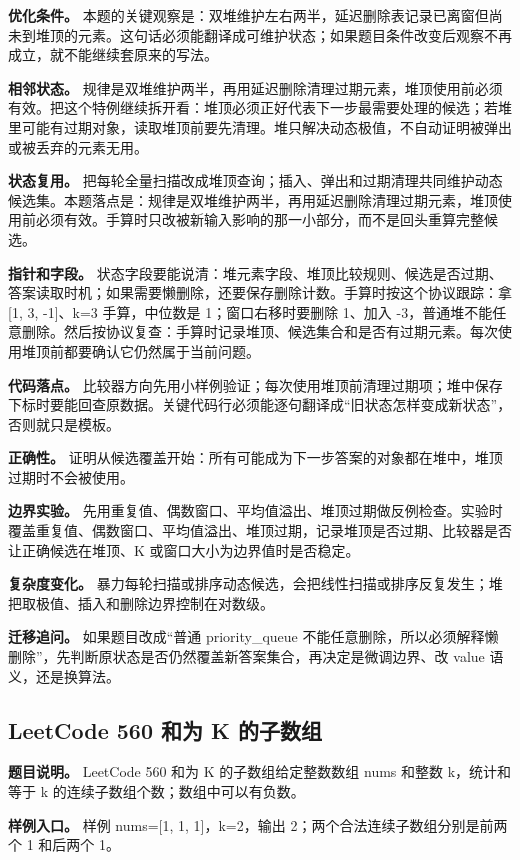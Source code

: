 \textbf{优化条件。} 本题的关键观察是：双堆维护左右两半，延迟删除表记录已离窗但尚未到堆顶的元素。这句话必须能翻译成可维护状态；如果题目条件改变后观察不再成立，就不能继续套原来的写法。

\textbf{相邻状态。} 规律是双堆维护两半，再用延迟删除清理过期元素，堆顶使用前必须有效。把这个特例继续拆开看：堆顶必须正好代表下一步最需要处理的候选；若堆里可能有过期对象，读取堆顶前要先清理。堆只解决动态极值，不自动证明被弹出或被丢弃的元素无用。

\textbf{状态复用。} 把每轮全量扫描改成堆顶查询；插入、弹出和过期清理共同维护动态候选集。本题落点是：规律是双堆维护两半，再用延迟删除清理过期元素，堆顶使用前必须有效。手算时只改被新输入影响的那一小部分，而不是回头重算完整候选。

\textbf{指针和字段。} 状态字段要能说清：堆元素字段、堆顶比较规则、候选是否过期、答案读取时机；如果需要懒删除，还要保存删除计数。手算时按这个协议跟踪：拿 [1, 3, -1]、k=3 手算，中位数是 1；窗口右移时要删除 1、加入 -3，普通堆不能任意删除。然后按协议复查：手算时记录堆顶、候选集合和是否有过期元素。每次使用堆顶前都要确认它仍然属于当前问题。

\textbf{代码落点。} 比较器方向先用小样例验证；每次使用堆顶前清理过期项；堆中保存下标时要能回查原数据。关键代码行必须能逐句翻译成“旧状态怎样变成新状态”，否则就只是模板。

\textbf{正确性。} 证明从候选覆盖开始：所有可能成为下一步答案的对象都在堆中，堆顶过期时不会被使用。

\textbf{边界实验。} 先用重复值、偶数窗口、平均值溢出、堆顶过期做反例检查。实验时覆盖重复值、偶数窗口、平均值溢出、堆顶过期，记录堆顶是否过期、比较器是否让正确候选在堆顶、K 或窗口大小为边界值时是否稳定。

\textbf{复杂度变化。} 暴力每轮扫描或排序动态候选，会把线性扫描或排序反复发生；堆把取极值、插入和删除边界控制在对数级。

\textbf{迁移追问。} 如果题目改成“普通 priority\_queue 不能任意删除，所以必须解释懒删除”，先判断原状态是否仍然覆盖新答案集合，再决定是微调边界、改 value 语义，还是换算法。

\subsection{LeetCode 560 和为 K 的子数组}

\textbf{题目说明。} LeetCode 560 和为 K 的子数组给定整数数组 nums 和整数 k，统计和等于 k 的连续子数组个数；数组中可以有负数。

\textbf{样例入口。} 样例 nums=[1, 1, 1]，k=2，输出 2；两个合法连续子数组分别是前两个 1 和后两个 1。

